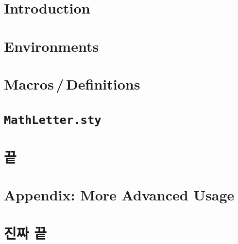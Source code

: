 \documentclass[10pt]{beamer}
\begin{document}
\begin{frame}[plain]
  \maketitle
\end{frame}

\section{Introduction}


\section{Environments}


\section{Macros\,/\,Definitions}


\section{\texttt{MathLetter.sty}}


\section{끝}

\section{Appendix: More Advanced Usage}


\section{진짜 끝}
\end{document}
